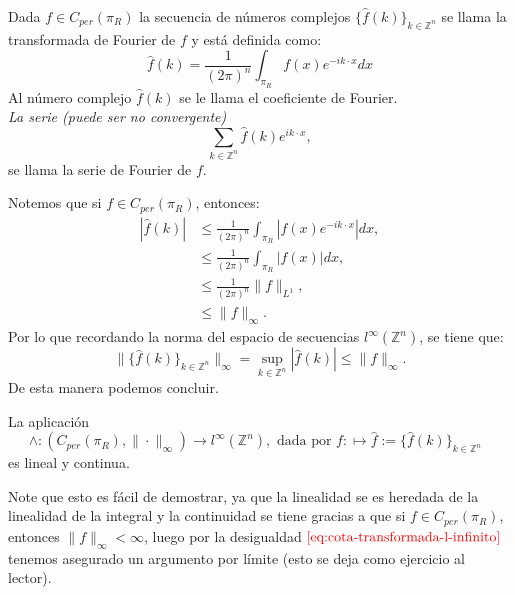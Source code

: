     \begin{definition}
      Dada $f\in C_{per}(\pi_R)$ la secuencia de números complejos $\{\hat{f}(k)\}_{k\in\mathbb{Z}^{n}}$  se llama la transformada de Fourier de $f$ y está definida como:
      \begin{equation}
        \hat{f}(k)=\frac{1}{(2\pi)^n}\int_{\pi_R}f(x)e^{-ik\cdot x}dx\label{eq:transformada-de-f-en-k}  
      \end{equation}
      Al número complejo $\hat{f}(k)$ se le llama el coeficiente de Fourier.\\
      \textit{La serie (puede ser no convergente)}
      \begin{equation}
        \sum_{k\in\mathbb{Z}^{n}}\hat{f}(k)e^{ik\cdot x},\label{eq:serie-transformada-de-f} 
      \end{equation}
      se llama la serie de Fourier de $f$.
    \end{definition}
    Notemos que si $f\in C_{per}(\pi_R)$, entonces:
    \begin{align*}
      |\hat{f}(k)|&\leq\frac{1}{(2\pi)^{n}}\int_{\pi_R}|f(x)e^{-ik\cdot x}|dx,\\
      &\leq\frac{1}{(2\pi)^{n}}\int_{\pi_R}|f(x)|dx,\\
      &\leq \frac{1}{(2\pi)^{n}}\|f\|_{L^1},\\
      &\leq \|f\|_{\infty}.
    \end{align*}
    Por lo que recordando la norma del espacio de secuencias $l^{\infty}(\mathbb{Z}^{n})$, se tiene que:
    \begin{equation}
      \|\{\hat{f}(k)\}_{k\in\mathbb{Z}^{n}}\|_{\infty}=\sup_{k\in\mathbb{Z}^{n}}|\hat{f}(k)|\leq \|f\|_{\infty}.\label{eq:cota-transformada-l-infinito}
    \end{equation}
    De esta manera podemos concluir.
    \begin{proposition}
      La aplicación
      $$\wedge:(C_{per}(\pi_R),\|\cdot\|_{\infty})\rightarrow l^{\infty}(\mathbb{Z}^{n}),\text{ dada por $f:\longmapsto \hat{f}:=\{\hat{f}(k)\}_{k\in\mathbb{Z}^{n}}$ }$$
      es lineal y continua.
    \end{proposition}
    Note que esto es fácil de demostrar, ya que la linealidad se es heredada de la linealidad de la integral y la continuidad se tiene gracias a que si $f\in C_{per}(\pi_R)$, entonces $\|f\|_{\infty}<\infty$, luego por la desigualdad $\textcolor{red}{\ref{eq:cota-transformada-l-infinito}}$ tenemos asegurado un argumento por límite (esto se deja como ejercicio al lector).\\
